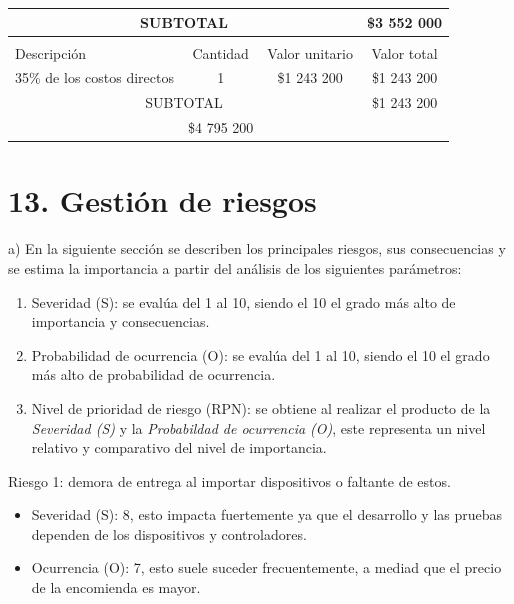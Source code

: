 \documentclass[
11pt, %
]{charter}
\begin{document}
\begin{table}[htpb]
\begin{tabularx}{\linewidth}{@{}|X|c|r|r|@{}}
\multicolumn{3}{|c|}{SUBTOTAL} &
  \multicolumn{1}{c|}{\$3 552 000} \\ \hline
  
\rowcolor[HTML]{C0C0C0} 
\multicolumn{4}{|c|}{\cellcolor[HTML]{C0C0C0}COSTOS INDIRECTOS} \\ \hline
\rowcolor[HTML]{C0C0C0} 
Descripción &
  \multicolumn{1}{c|}{\cellcolor[HTML]{C0C0C0}Cantidad} &
  \multicolumn{1}{c|}{\cellcolor[HTML]{C0C0C0}Valor unitario} &
  \multicolumn{1}{c|}{\cellcolor[HTML]{C0C0C0}Valor total} \\ \hline
  
  \multicolumn{1}{|l|}{35\% de los costos directos}&
  \multicolumn{1}{c|}{1} &
  \multicolumn{1}{c|}{\$1 243 200} &
  \multicolumn{1}{c|}{\$1 243 200} \\ \hline
  
\multicolumn{3}{|c|}{SUBTOTAL} &
  \multicolumn{1}{c|}{\$1 243 200} \\ \hline
\rowcolor[HTML]{C0C0C0}
\multicolumn{3}{|c|}{TOTAL} &
\multicolumn{1}{c|}{\$4 795 200} \\ \hline

\end{tabularx}
\end{table}


\section{13. Gestión de riesgos}
\label{sec:riesgos}


a) En la siguiente sección se describen los principales riesgos, sus consecuencias y se estima la importancia a partir del análisis de los siguientes parámetros:

\begin{enumerate}
\item Severidad (S): se evalúa del 1 al 10, siendo el 10 el grado más alto de importancia y consecuencias.
\item Probabilidad de ocurrencia (O): se evalúa del 1 al 10, siendo el 10 el grado más alto de probabilidad de ocurrencia.
\item Nivel de prioridad de riesgo (RPN): se obtiene al realizar el producto de la \textit{Severidad (S)} y la \textit{Probabildad de ocurrencia (O)}, este representa un nivel relativo y comparativo del nivel de importancia.
\end{enumerate}

Riesgo 1: demora de entrega al importar dispositivos o faltante de estos.
\begin{itemize}
	\item Severidad (S): 8, esto impacta fuertemente ya que el desarrollo y las pruebas dependen de los dispositivos y controladores.
	\item Ocurrencia (O): 7, esto suele suceder frecuentemente, a mediad que el precio de la encomienda es mayor.
\end{itemize}
\end{document}
